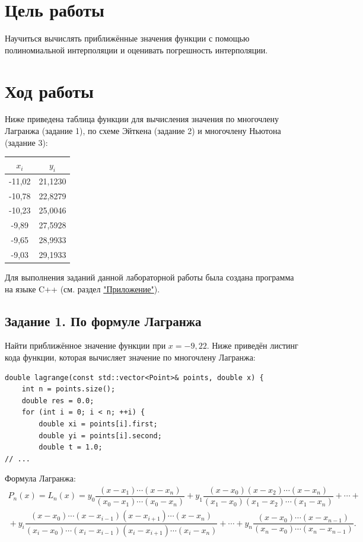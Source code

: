 \documentclass[14pt,a4paper]{extarticle}
\begin{document}
	\section{Цель работы}
	Научиться вычислять приближённые значения функции с помощью полиномиальной интерполяции и оценивать погрешность интерполяции.
	
	\section{Ход работы}
	Ниже приведена таблица функции для вычисления значения по многочлену Лагранжа (задание 1), по схеме Эйткена (задание 2) и многочлену Ньютона (задание 3):
	
	\begin{table}[h]
		\centering
		\begin{tabular}{|c|c|}
			\hline
			$x_i$ & $y_i$ \\ \hline
			-11,02 & 21,1230 \\ \hline
			-10,78 & 22,8279 \\ \hline
			-10,23 & 25,0046 \\ \hline
			-9,89 & 27,5928 \\ \hline
			-9,65 & 28,9933 \\ \hline
			-9,03 & 29,1933 \\ \hline
		\end{tabular}
	\end{table}
	
	Для выполнения заданий данной лабораторной работы была создана программа на языке C++ (см. раздел \hyperref[code]{"Приложение"}). 
	
	\newpage
	
	\subsection{Задание 1. По формуле Лагранжа}
	Найти приближённое значение функции при $x= -9,22$. Ниже приведён листинг кода функции, которая вычисляет значение по многочлену Лагранжа:
	
	\begin{lstlisting}[label=lag]
double lagrange(const std::vector<Point>& points, double x) {
	int n = points.size();
	double res = 0.0;
	for (int i = 0; i < n; ++i) {
		double xi = points[i].first;
		double yi = points[i].second;
		double t = 1.0;
// ...
	\end{lstlisting}
	
	\noindent Формула Лагранжа:
	\begingroup\small
	\begin{multline*}
		P_n(x)=L_n(x)=
		y_0\dfrac{(x-x_1)\cdots(x-x_n)}{(x_0-x_1)\cdots(x_0-x_n)}
		+y_1\dfrac{(x-x_0)(x-x_2)\cdots(x-x_n)}{(x_1-x_0)(x_1-x_2)\cdots(x_1-x_n)}
		+\cdots+{}\\
		{}+y_i\dfrac{(x-x_0)\cdots(x-x_{i-1})(x-x_{i+1})\cdots(x-x_n)}
		{(x_i-x_0)\cdots(x_i-x_{i-1})(x_i-x_{i+1})\cdots(x_i-x_n)}
		+\cdots+
		y_n\dfrac{(x-x_0)\cdots(x-x_{n-1})}{(x_n-x_0)\cdots(x_n-x_{n-1})}.
	\end{multline*}
	\endgroup
	
\end{document}
